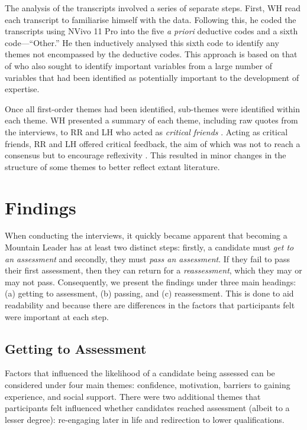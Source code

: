 \documentclass[
  12pt,
  a4paper,
]{book}
\begin{document}
The analysis of the transcripts involved a series of separate steps. First, WH read each transcript to familiarise himself with the data. Following this, he coded the transcripts using NVivo 11 Pro \citep{QSR2017} into the five \emph{a priori} deductive codes and a sixth code---``Other.'' He then inductively analysed this sixth code to identify any themes not encompassed by the deductive codes. This approach is based on that of \citet{Hardy2017} who also sought to identify important variables from a large number of variables that had been identified as potentially important to the development of expertise.

Once all first-order themes had been identified, sub-themes were identified within each theme. WH presented a summary of each theme, including raw quotes from the interviews, to RR and LH who acted as \emph{critical friends} \citep[cf.~][]{Sparkes2014, Smith2018a}. Acting as critical friends, RR and LH offered critical feedback, the aim of which was not to reach a consensus but to encourage reflexivity \citep{Smith2018a}. This resulted in minor changes in the structure of some themes to better reflect extant literature.

\hypertarget{qual-findings}{%
\section{Findings}\label{qual-findings}}

When conducting the interviews, it quickly became apparent that becoming a Mountain Leader has at least two distinct steps: firstly, a candidate must \emph{get to an assessment} and secondly, they must \emph{pass an assessment}. If they fail to pass their first assessment, then they can return for a \emph{reassessment}, which they may or may not pass. Consequently, we present the findings under three main headings: (a) getting to assessment, (b) passing, and (c) reassessment. This is done to aid readability and because there are differences in the factors that participants felt were important at each step.

\hypertarget{qual-gta}{%
\subsection{Getting to Assessment}\label{qual-gta}}

Factors that influenced the likelihood of a candidate being assessed can be considered under four main themes: confidence, motivation, barriers to gaining experience, and social support. There were two additional themes that participants felt influenced whether candidates reached assessment (albeit to a lesser degree): re-engaging later in life and redirection to lower qualifications.
\end{document}
